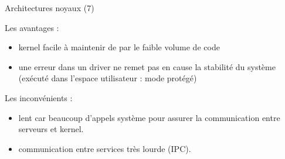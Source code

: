 \documentclass[12pt, t]{beamer}
\newcommand{\bi}{\begin{itemize}}
\newcommand{\ei}{\end{itemize}}
\begin{document}
\begin{frame}{Architectures noyaux (7)}

    \vspace{15pt}
    Les avantages :
    \vspace{5pt}
    \bi
    \itemsep8pt
    \item kernel facile à maintenir de par le faible volume de code
    \item une erreur dans un driver ne remet pas en cause la stabilité du
          système (exécuté dans l'espace utilisateur : mode protégé)
    \ei

    {
        \vspace{15pt}
        Les inconvénients :
        \vspace{5pt}
        \bi
        \itemsep8pt
        \item lent car beaucoup d'appels système pour assurer la communication
              entre serveurs et kernel.
          \item communication entre services très lourde (IPC).
        \ei
    }

\end{frame}
\end{document}
